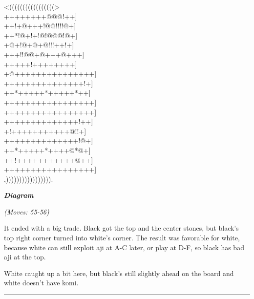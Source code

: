 \documentclass[letterpaper,12pt]{memoir}
\newcounter{GoFigure}[part]
\newcommand{\gofigure}{%
 \stepcounter{GoFigure}
 \centerline{\textit{\textbf{Diagram \arabic{GoFigure}}}}
}
\newcommand{\subtext}[1]{\centerline{\textit{#1}}}
\begin{document}
\begin{minipage}[t]{240pt}

{\gnos
<(((((((((((((((((>\\
++++++++@@@!++]\\
++!+@+++!@@!!!!@+]\\
++*!@+!+!@!@@@!@+]\\
+@+!@+@+@!!!++!+]\\
+++!!@@+@+++@+++]\\
+++++!++++++++]\\
+@+++++++++++++++]\\
+++++++++++++++!+]\\
++*+++++*+++++*++]\\
+++++++++++++++++]\\
+++++++++++++++++]\\
++++++++++++++!++]\\
+!+++++++++++@!!+]\\
++++++++++++++!@+]\\
++*+++++*++++@*@+]\\
++!+++++++++++@++]\\
+++++++++++++++++]\\
,))))))))))))))))).\\
}
\gofigure
\subtext{(Moves: 55-56)}
\end{minipage}
\begin{minipage}[t]{115.19999999999999pt}
\setlength{\parskip}{0.5em}
It ended with a big trade. Black got the top and the center stones, but black's top right corner turned into white's corner. The result was favorable for white, because white can still exploit aji at A-C later, or play at D-F, so black has bad aji at the top.

White caught up a bit here, but black's still slightly ahead on the board and white doesn't have komi.


\end{minipage}
\vfill

\rule{\textwidth}{0.5pt}
\end{document}
